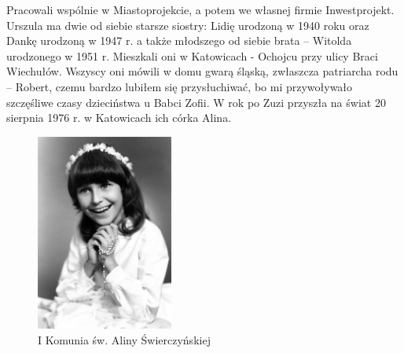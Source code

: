 Pracowali wspólnie w Miastoprojekcie, a potem we własnej firmie Inwestprojekt. Urszula ma dwie od siebie starsze siostry: Lidię urodzoną w 1940 roku oraz Dankę urodzoną w 1947 r. a także młodszego od siebie brata – Witolda urodzonego w 1951 r. Mieszkali oni w Katowicach - Ochojcu przy ulicy Braci Wiechułów. Wszyscy oni mówili w domu gwarą śląską, zwłaszcza patriarcha rodu – Robert, czemu bardzo lubiłem się przysłuchiwać, bo mi przywoływało szczęśliwe czasy dzieciństwa u Babci Zofii. W rok po Zuzi przyszła na świat 20 sierpnia 1976 r. w Katowicach ich córka Alina.

\begin{figure}[!h]
\begin{center}
\includegraphics[width=0.4\textwidth]{photo/alina_swierczynska_komunia.jpg}
\caption{I Komunia św. Aliny Świerczyńskiej}
\end{center}
\end{figure}

